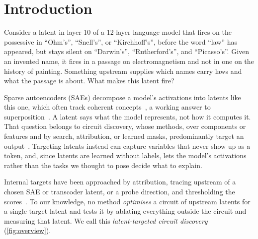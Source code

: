 \documentclass[10pt]{article}
\begin{document}
\section{Introduction}
Consider a latent in layer 10 of a 12-layer language model that fires on the possessive in ``Ohm's'', ``Snell's'', or ``Kirchhoff's'', before the word ``law'' has appeared, but stays silent on ``Darwin's'', ``Rutherford's'', and ``Picasso's''.
Given an invented name, it fires in a passage on electromagnetism and not in one on the history of painting.
Something upstream supplies which names carry laws and what the passage is about.
What makes this latent fire?

Sparse autoencoders (SAEs) decompose a model's activations into latents like this one, which often track coherent concepts~\citep{cunningham2024sparse, bricken2023monosemanticity, gao2024scaling, templeton2024scaling}, a working answer to superposition~\citep{elhage2022toy}.
A latent says what the model represents, not how it computes it.
That question belongs to circuit discovery, whose methods, over components or features and by search, attribution, or learned masks, predominantly target an output~\citep{conmy2023towards, syed2023attribution, marks2025sparse, ameisen2025circuit, bhaskar2024finding, caples2025scaling}.
Targeting latents instead can capture variables that never show up as a token, and, since latents are learned without labels, lets the model's activations rather than the tasks we thought to pose decide what to explain.

Internal targets have been approached by attribution, tracing upstream of a chosen SAE or transcoder latent, or a probe direction, and thresholding the scores~\citep{ge2024automatically, golimblevskaia2025circuit, palit2026probes}.
To our knowledge, no method \emph{optimises} a circuit of upstream latents for a single target latent and tests it by ablating everything outside the circuit and measuring that latent.
We call this \emph{latent-targeted circuit discovery} (\cref{fig:overview}).
\end{document}
